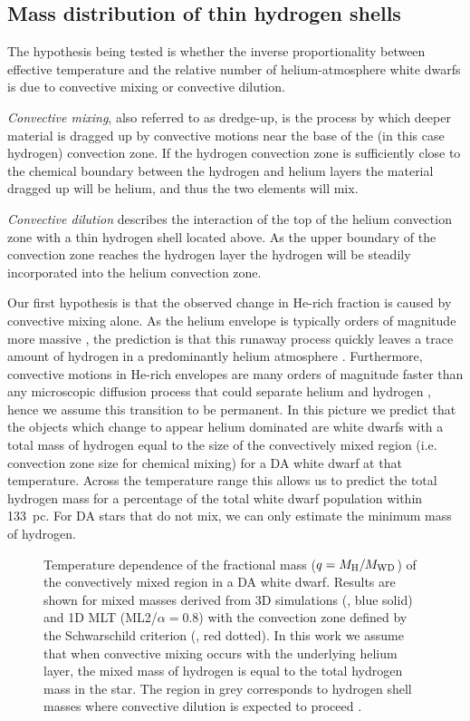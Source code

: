 \documentclass[a4paper,fleqn,usenatbib]{mnras}
\begin{document}
\subsection{Mass distribution of thin hydrogen shells}

The hypothesis being tested is whether the inverse proportionality between effective temperature and the relative number of helium-atmosphere white dwarfs is due to convective mixing or convective dilution. 

{\it Convective mixing}, also referred to as dredge-up, is the process by which deeper material is dragged up by convective motions near the base of the (in this case hydrogen) convection zone. If the hydrogen convection zone is sufficiently close to the chemical boundary between the hydrogen and helium layers the material dragged up will be helium, and thus the two elements will mix. 

{\it Convective dilution} describes the interaction of the top of the helium convection zone with a thin hydrogen shell located above. As the upper boundary of the convection zone reaches the hydrogen layer the hydrogen will be steadily incorporated into the helium convection zone.

Our first hypothesis is that the observed change in He-rich fraction is caused by convective mixing alone. As the helium envelope is typically orders of magnitude more massive \citep{iben1983,romero19}, the prediction is that this runaway process quickly leaves a trace amount of hydrogen in a predominantly helium atmosphere \citep{rolland18}. Furthermore, convective motions in He-rich envelopes are many orders of magnitude faster \citep{fontaine1976} than any microscopic diffusion process that could separate helium and hydrogen \citep{koester09}, hence we assume this transition to be permanent.  In this picture we predict that the objects which change to appear helium dominated are white dwarfs with a total mass of hydrogen equal to the size of the convectively mixed region (i.e. convection zone size for chemical mixing) for a DA white dwarf at that temperature. Across the temperature range this allows us to predict the total hydrogen mass for a percentage of the total white dwarf population within 133~pc. For DA stars that do not mix, we can only estimate the minimum mass of hydrogen. 

\begin{figure}
 \centering
 \caption{Temperature dependence of the fractional mass ($q = M_{\rm H}/M_{\rm WD}$) of the convectively mixed region in a DA white dwarf. Results are shown for mixed masses derived from 3D simulations (\citealt{cunningham19}, blue solid) and 1D MLT (ML2/$\alpha=0.8$) with the convection zone defined by the Schwarschild criterion (\citealt{koester09}, red dotted).
 In this work we assume that when convective mixing occurs with the underlying helium layer, the mixed mass of hydrogen is equal to the total hydrogen mass in the star. The region in grey corresponds to hydrogen shell masses where convective dilution is expected to proceed \citep{genest-Beaulieu19}. }
 \label{fg:mixed-mass}
\end{figure}
\end{document}
